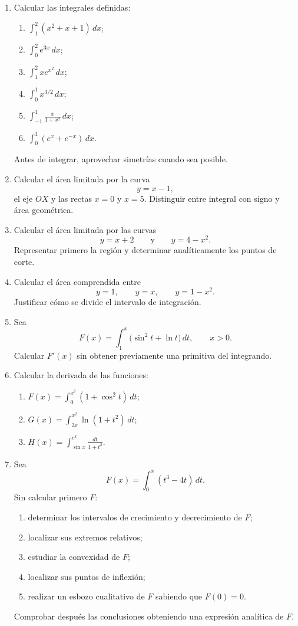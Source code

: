 \begin{enumerate}
\item Calcular las integrales definidas:
\begin{enumerate}[label=\alph*)]
\item $\displaystyle\int_1^2(x^2+x+1)\,dx$;
\item $\displaystyle\int_0^2e^{3x}\,dx$;
\item $\displaystyle\int_1^2xe^{x^2}\,dx$;
\item $\displaystyle\int_0^1x^{3/2}\,dx$;
\item $\displaystyle\int_{-1}^{1}\frac{x}{1+x^2}\,dx$;
\item $\displaystyle\int_0^1(e^x+e^{-x})\,dx$.
\end{enumerate}
Antes de integrar, aprovechar simetrías cuando sea posible.

\item Calcular el área limitada por la curva
\[
y=x-1,
\]
el eje $OX$ y las rectas $x=0$ y $x=5$. Distinguir entre integral con signo y área geométrica.

\item Calcular el área limitada por las curvas
\[
y=x+2
\qquad\text{y}\qquad
y=4-x^2.
\]
Representar primero la región y determinar analíticamente los puntos de corte.

\item Calcular el área comprendida entre
\[
y=1,\qquad y=x,\qquad y=1-x^2.
\]
Justificar cómo se divide el intervalo de integración.

\item Sea
\[
F(x)=\int_1^x\bigl(\sin^2t+\ln t\bigr)\,dt,
\qquad x>0.
\]
Calcular $F'(x)$ sin obtener previamente una primitiva del integrando.

\item Calcular la derivada de las funciones:
\begin{enumerate}[label=\alph*)]
\item $\displaystyle F(x)=\int_0^{x^2}(1+\cos^2t)\,dt$;
\item $\displaystyle G(x)=\int_{2x}^{x^2}\ln(1+t^2)\,dt$;
\item $\displaystyle H(x)=\int_{\sin x}^{e^x}\frac{dt}{1+t^2}$.
\end{enumerate}

\item Sea
\[
F(x)=\int_0^x(t^3-4t)\,dt.
\]
Sin calcular primero $F$:
\begin{enumerate}[label=\alph*)]
\item determinar los intervalos de crecimiento y decrecimiento de $F$;
\item localizar sus extremos relativos;
\item estudiar la convexidad de $F$;
\item localizar sus puntos de inflexión;
\item realizar un esbozo cualitativo de $F$ sabiendo que $F(0)=0$.
\end{enumerate}
Comprobar después las conclusiones obteniendo una expresión analítica de $F$.


\end{enumerate}
